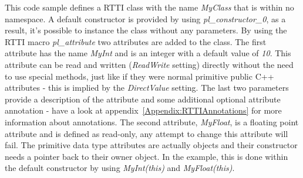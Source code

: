 This code sample defines a RTTI class with the name \emph{MyClass} that is within no namespace. A default constructor is provided by using \emph{pl\_constructor\_0}, as a result, it's possible to instance the class without any parameters. By using the RTTI macro \emph{pl\_attribute} two attributes are added to the class. The first attribute has the name \emph{MyInt} and is an integer with a default value of \emph{10}. This attribute can be read and written (\emph{ReadWrite} setting) directly without the need to use special methods, just like if they were normal primitive public C++ attributes - this is implied by the \emph{DirectValue} setting. The last two parameters provide a description of the attribute and some additional optional attribute annotation - have a look at appendix~\ref{Appendix:RTTIAnnotations} for more information about annotations. The second attribute, \emph{MyFloat}, is a floating point attribute and is defined as read-only, any attempt to change this attribute will fail. The primitive data type attributes are actually objects and their constructor needs a pointer back to their owner object. In the example, this is done within the default constructor by using \emph{MyInt(this)} and \emph{MyFloat(this)}.


